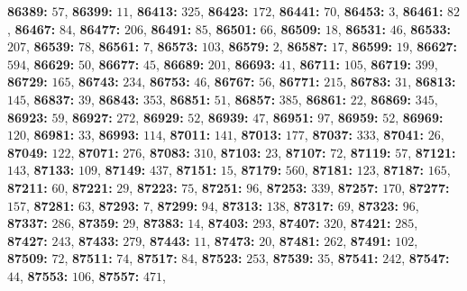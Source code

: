 \textsf{\bfseries 86389:} $57$, \textsf{\bfseries 86399:} $11$, \textsf{\bfseries 86413:} $325$, \textsf{\bfseries 86423:} $172$, \textsf{\bfseries 86441:} $70$, \textsf{\bfseries 86453:} $3$, \textsf{\bfseries 86461:} $82$, \textsf{\bfseries 86467:} $84$, \textsf{\bfseries 86477:} $206$, \textsf{\bfseries 86491:} $85$, \textsf{\bfseries 86501:} $66$, \textsf{\bfseries 86509:} $18$, \textsf{\bfseries 86531:} $46$, \textsf{\bfseries 86533:} $207$, \textsf{\bfseries 86539:} $78$, \textsf{\bfseries 86561:} $7$, \textsf{\bfseries 86573:} $103$, \textsf{\bfseries 86579:} $2$, \textsf{\bfseries 86587:} $17$, \textsf{\bfseries 86599:} $19$, \textsf{\bfseries 86627:} $594$, \textsf{\bfseries 86629:} $50$, \textsf{\bfseries 86677:} $45$, \textsf{\bfseries 86689:} $201$, \textsf{\bfseries 86693:} $41$, \textsf{\bfseries 86711:} $105$, \textsf{\bfseries 86719:} $399$, \textsf{\bfseries 86729:} $165$, \textsf{\bfseries 86743:} $234$, \textsf{\bfseries 86753:} $46$, \textsf{\bfseries 86767:} $56$, \textsf{\bfseries 86771:} $215$, \textsf{\bfseries 86783:} $31$, \textsf{\bfseries 86813:} $145$, \textsf{\bfseries 86837:} $39$, \textsf{\bfseries 86843:} $353$, \textsf{\bfseries 86851:} $51$, \textsf{\bfseries 86857:} $385$, \textsf{\bfseries 86861:} $22$, \textsf{\bfseries 86869:} $345$, \textsf{\bfseries 86923:} $59$, \textsf{\bfseries 86927:} $272$, \textsf{\bfseries 86929:} $52$, \textsf{\bfseries 86939:} $47$, \textsf{\bfseries 86951:} $97$, \textsf{\bfseries 86959:} $52$, \textsf{\bfseries 86969:} $120$, \textsf{\bfseries 86981:} $33$, \textsf{\bfseries 86993:} $114$, \textsf{\bfseries 87011:} $141$, \textsf{\bfseries 87013:} $177$, \textsf{\bfseries 87037:} $333$, \textsf{\bfseries 87041:} $26$, \textsf{\bfseries 87049:} $122$, \textsf{\bfseries 87071:} $276$, \textsf{\bfseries 87083:} $310$, \textsf{\bfseries 87103:} $23$, \textsf{\bfseries 87107:} $72$, \textsf{\bfseries 87119:} $57$, \textsf{\bfseries 87121:} $143$, \textsf{\bfseries 87133:} $109$, \textsf{\bfseries 87149:} $437$, \textsf{\bfseries 87151:} $15$, \textsf{\bfseries 87179:} $560$, \textsf{\bfseries 87181:} $123$, \textsf{\bfseries 87187:} $165$, \textsf{\bfseries 87211:} $60$, \textsf{\bfseries 87221:} $29$, \textsf{\bfseries 87223:} $75$, \textsf{\bfseries 87251:} $96$, \textsf{\bfseries 87253:} $339$, \textsf{\bfseries 87257:} $170$, \textsf{\bfseries 87277:} $157$, \textsf{\bfseries 87281:} $63$, \textsf{\bfseries 87293:} $7$, \textsf{\bfseries 87299:} $94$, \textsf{\bfseries 87313:} $138$, \textsf{\bfseries 87317:} $69$, \textsf{\bfseries 87323:} $96$, \textsf{\bfseries 87337:} $286$, \textsf{\bfseries 87359:} $29$, \textsf{\bfseries 87383:} $14$, \textsf{\bfseries 87403:} $293$, \textsf{\bfseries 87407:} $320$, \textsf{\bfseries 87421:} $285$, \textsf{\bfseries 87427:} $243$, \textsf{\bfseries 87433:} $279$, \textsf{\bfseries 87443:} $11$, \textsf{\bfseries 87473:} $20$, \textsf{\bfseries 87481:} $262$, \textsf{\bfseries 87491:} $102$, \textsf{\bfseries 87509:} $72$, \textsf{\bfseries 87511:} $74$, \textsf{\bfseries 87517:} $84$, \textsf{\bfseries 87523:} $253$, \textsf{\bfseries 87539:} $35$, \textsf{\bfseries 87541:} $242$, \textsf{\bfseries 87547:} $44$, \textsf{\bfseries 87553:} $106$, \textsf{\bfseries 87557:} $471$, 
